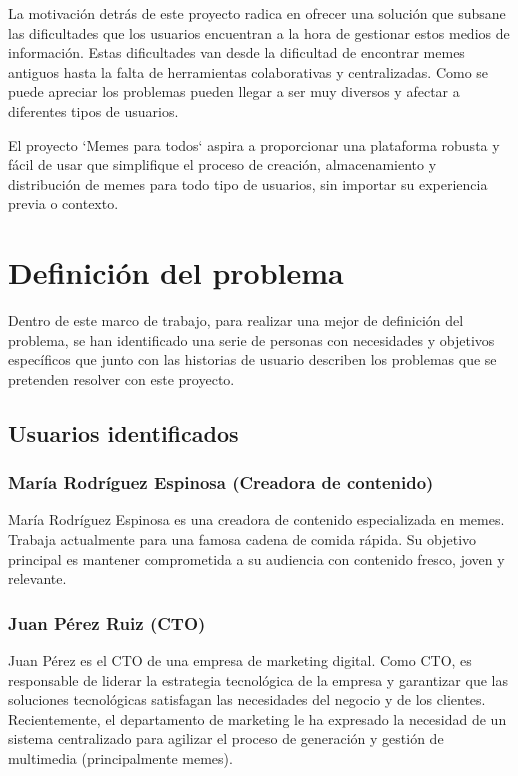La motivación detrás de este proyecto radica en ofrecer una solución que subsane las dificultades que los usuarios encuentran a la hora de gestionar estos medios de información. Estas dificultades van desde la dificultad de encontrar memes antiguos hasta la falta de herramientas colaborativas y centralizadas. Como se puede apreciar los problemas pueden llegar a ser muy diversos y afectar a diferentes tipos de usuarios.

El proyecto `Memes para todos` aspira a proporcionar una plataforma robusta y fácil de usar que simplifique el proceso de creación, almacenamiento y distribución de memes para todo tipo de usuarios, sin importar su experiencia previa o contexto.

\section{Definición del problema}

Dentro de este marco de trabajo, para realizar una mejor de definición del problema, se han identificado una serie de personas con necesidades y objetivos específicos que junto con las historias de usuario describen los problemas que se pretenden resolver con este proyecto.

\subsection{Usuarios identificados}

    \subsubsection{María Rodríguez Espinosa (Creadora de contenido)}

    María Rodríguez Espinosa es una creadora de contenido especializada en memes. Trabaja actualmente para una famosa cadena de comida rápida. Su objetivo principal es mantener comprometida a su audiencia con contenido fresco, joven y relevante.

    \subsubsection{Juan Pérez Ruiz (CTO)}

    Juan Pérez es el CTO de una empresa de marketing digital. Como CTO, es responsable de liderar la estrategia tecnológica de la empresa y garantizar que las soluciones tecnológicas satisfagan las necesidades del negocio y de los clientes. Recientemente, el departamento de marketing le ha expresado la necesidad de un sistema centralizado para agilizar el proceso de generación y gestión de multimedia (principalmente memes).

